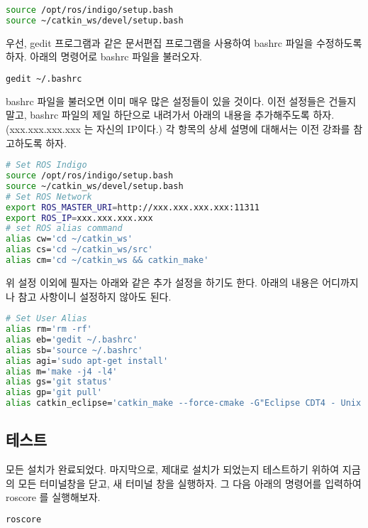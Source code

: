\begin{lstlisting}[language=bash]
source /opt/ros/indigo/setup.bash
source ~/catkin_ws/devel/setup.bash
\end{lstlisting}

우선, gedit 프로그램과 같은 문서편집 프로그램을 사용하여 bashrc 파일을 수정하도록 하자. 아래의 명령어로 bashrc 파일을 불러오자.

\begin{lstlisting}[language=bash]
gedit ~/.bashrc
\end{lstlisting}

bashrc 파일을 불러오면 이미 매우 많은 설정들이 있을 것이다. 이전 설정들은 건들지 말고, bashrc 파일의 제일 하단으로 내려가서 아래의 내용을 추가해주도록 하자. (xxx.xxx.xxx.xxx 는 자신의 IP이다.) 각 항목의 상세 설명에 대해서는 이전 강좌를 참고하도록 하자.

\begin{lstlisting}[language=bash]
# Set ROS Indigo
source /opt/ros/indigo/setup.bash
source ~/catkin_ws/devel/setup.bash
# Set ROS Network
export ROS_MASTER_URI=http://xxx.xxx.xxx.xxx:11311
export ROS_IP=xxx.xxx.xxx.xxx
# set ROS alias command
alias cw='cd ~/catkin_ws'
alias cs='cd ~/catkin_ws/src'
alias cm='cd ~/catkin_ws && catkin_make'
\end{lstlisting}

위 설정 이외에 필자는 아래와 같은 추가 설정을 하기도 한다. 아래의 내용은 어디까지나 참고 사항이니 설정하지 않아도 된다.

\begin{lstlisting}[language=bash]
# Set User Alias
alias rm='rm -rf' 
alias eb='gedit ~/.bashrc' 
alias sb='source ~/.bashrc'
alias agi='sudo apt-get install'  
alias m='make -j4 -l4'  
alias gs='git status'  
alias gp='git pull'
alias catkin_eclipse='catkin_make --force-cmake -G"Eclipse CDT4 - Unix Makefiles"'
\end{lstlisting}

\subsection{테스트}

모든 설치가 완료되었다. 마지막으로, 제대로 설치가 되었는지 테스트하기 위하여 지금의 모든 터미널창을 닫고, 새 터미널 창을 실행하자. 그 다음 아래의 명령어를 입력하여 roscore 를 실행해보자.

\begin{lstlisting}[language=bash]
roscore
\end{lstlisting}

